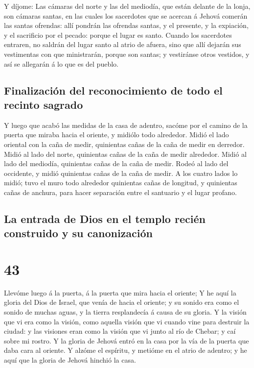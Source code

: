  Y díjome: Las cámaras del norte y las del mediodía, que
están delante de la lonja, son cámaras santas, en las cuales los
sacerdotes que se acercan á Jehová comerán las santas ofrendas: allí
pondrán las ofrendas santas, y el presente, y la expiación, y el
sacrificio por el pecado: porque el lugar es santo.  Cuando
los sacerdotes entraren, no saldrán del lugar santo al atrio de afuera,
sino que allí dejarán sus vestimentas con que ministrarán, porque son
santas; y vestiránse otros vestidos, y así se allegarán á lo que es del
pueblo.

\hypertarget{finalizaciuxf3n-del-reconocimiento-de-todo-el-recinto-sagrado}{%
\subsection{Finalización del reconocimiento de todo el recinto
sagrado}\label{finalizaciuxf3n-del-reconocimiento-de-todo-el-recinto-sagrado}}

 Y luego que acabó las medidas de la casa de adentro,
sacóme por el camino de la puerta que miraba hacia el oriente, y midiólo
todo alrededor.  Midió el lado oriental con la caña de
medir, quinientas cañas de la caña de medir en derredor. 
Midió al lado del norte, quinientas cañas de la caña de medir alrededor.
 Midió al lado del mediodía, quinientas cañas de la caña de
medir.  Rodeó al lado del occidente, y midió quinientas
cañas de la caña de medir.  A los cuatro lados lo midió;
tuvo el muro todo alrededor quinientas cañas de longitud, y quinientas
cañas de anchura, para hacer separación entre el santuario y el lugar
profano.

\hypertarget{la-entrada-de-dios-en-el-templo-reciuxe9n-construido-y-su-canonizaciuxf3n}{%
\subsection{La entrada de Dios en el templo recién construido y su
canonización}\label{la-entrada-de-dios-en-el-templo-reciuxe9n-construido-y-su-canonizaciuxf3n}}

\hypertarget{section-42}{%
\section{43}\label{section-42}}

 Llevóme luego á la puerta, á la puerta que mira hacia el
oriente;  Y he aquí la gloria del Dios de Israel, que venía
de hacia el oriente; y su sonido era como el sonido de muchas aguas, y
la tierra resplandecía á causa de su gloria.  Y la visión
que vi era como la visión, como aquella visión que vi cuando vine para
destruir la ciudad: y las visiones eran como la visión que vi junto al
río de Chebar; y caí sobre mi rostro.  Y la gloria de Jehová
entró en la casa por la vía de la puerta que daba cara al oriente.
 Y alzóme el espíritu, y metióme en el atrio de adentro; y
he aquí que la gloria de Jehová hinchió la casa.


